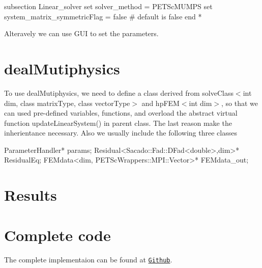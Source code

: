 \begin{DoxyCode}
subsection Linear\_solver
        set solver\_method = PETScMUMPS
        set system\_matrix\_symmetricFlag = \textcolor{keyword}{false} # \textcolor{keywordflow}{default} is \textcolor{keyword}{false}
end
*
\end{DoxyCode}
 Alteravely we can use G\-U\-I to set the parameters. \hypertarget{_intercalation_lib}{}\section{deal\-Mutiphysics}\label{_intercalation_lib}
To use deal\-Mutiphysics, we need to define a class derived from {\ttfamily solve\-Class$<$int dim, class matrix\-Type, class vector\-Type$>$} and {\ttfamily hp\-F\-E\-M$<$int dim$>$}, so that we can used pre-\/defined variables, functions, and overload the abstract virtual function {\ttfamily update\-Linear\-System()} in parent class. The last reason make the inherientance necessary. Also we usually include the following three classes 
\begin{DoxyCode}
ParameterHandler* params;   
Residual<Sacado::Fad::DFad<double>,dim>* ResidualEq;
FEMdata<dim, PETScWrappers::MPI::Vector>* FEMdata\_out;
\end{DoxyCode}
 \hypertarget{_intercalation_results}{}\section{Results}\label{_intercalation_results}
    \hypertarget{_intercalation_com}{}\section{Complete code}\label{_intercalation_com}
The complete implementaion can be found at \href{https://github.com/mechanoChem/mechanoChemFEM/tree/example/Example1%20Intercalation}{\tt Github}. 